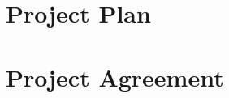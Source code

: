 \chapter{Project Plan}
\label{app:projectPlan}



\chapter{Project Agreement}
\label{app:agreement}


